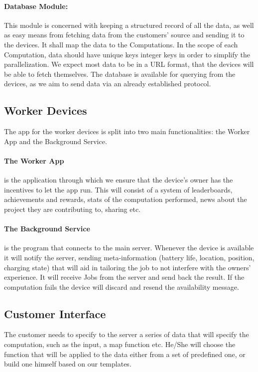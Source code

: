 \documentclass[a4paper,10pt]{article}
\begin{document}
\paragraph{Database Module:}

This module is concerned with keeping a structured record of all the data, as well as easy means from fetching data from the customers' source and sending it to the devices. It shall map the data to the Computations. In the scope of each Computation, data should have unique keys integer keys in order to simplify the parallelization. We expect most data to be in a URL format, that the devices will be able to fetch themselves.
The database is available for querying from the devices, as we aim to send data via an already established protocol. 

\subsection{Worker Devices}
The app for the worker devices is split into two main functionalities: the Worker App and the Background Service. 

\paragraph{The Worker App}
is the application through which we ensure that the device's owner has the incentives to let the app run. This will consist of a system of leaderboards, achievements and rewards, stats of the  computation performed, news about the project they are contributing to, sharing etc.
\paragraph{The Background Service} 
is the program that connects to the main server. Whenever the device is available it will notify the server, sending meta-information (battery life, location, position, charging state) that will aid in tailoring the job to not interfere with the owners' experience. It will receive Jobs from the server and send back the result. If the computation fails the device will discard and resend the availability message.

\subsection{Customer Interface}
The customer needs to specify to the server a series of data that will specify the computation, such as the input, a map function etc. He/She will choose the function that will be applied to the data either from a set of predefined one, or build one himself based on our templates.
\end{document}
